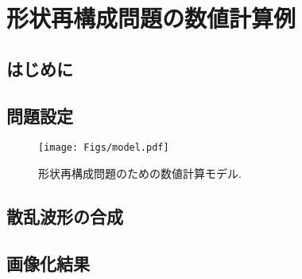 \section{形状再構成問題の数値計算例}
\subsection{はじめに}
\subsection{問題設定}
\begin{figure}[h]
	\begin{center}
	\texttt{[image: Figs/model.pdf]} 
	\end{center}
	\caption{ 形状再構成問題のための数値計算モデル.}
	\label{fig:}
\end{figure}
\subsection{散乱波形の合成}
\subsection{画像化結果}

